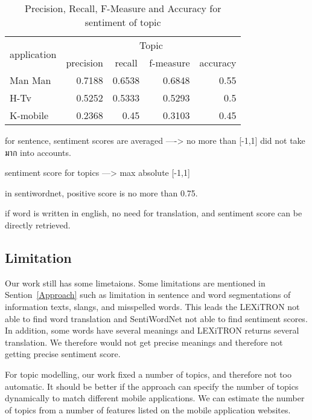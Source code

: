 \begin{table}
	\caption{Precision, Recall, F-Measure and Accuracy for sentiment of topic}
	\label{table:f-measureTopic}
	\centering
	\begin{tabular}{|l|r|r|r|r|}
		\hline
		\multicolumn{1}{|c|}{\multirow{2}{*}{application}} & 
		\multicolumn{4}{|c|}{Topic} \\
		\cline{2-5}
		\multicolumn{1}{|c|}{} &
		\multicolumn{1}{|c|}{precision}&
		\multicolumn{1}{|c|}{recall}&
		\multicolumn{1}{|c|}{f-measure} &
		\multicolumn{1}{|c|}{accuracy} \\
		\hline
		Man Man & 0.7188 & 0.6538 & 0.6848 & 0.55\\
		\hline
		H-Tv & 0.5252 & 0.5333 & 0.5293 & 0.5\\
		\hline
		K-mobile & 0.2368 & 0.45 & 0.3103 & 0.45\\
		\hline
	\end{tabular}
\end{table}


for sentence, sentiment scores are averaged ----> no more than [-1,1]
did not take มาก into accounts.


sentiment score for topics ---> max absolute [-1,1]


in sentiwordnet, positive score is no more than 0.75.


if word is written in english, no need for translation, and sentiment score can be directly retrieved.



\subsection*{Limitation}
Our work still has some limetaions. Some limitations are mentioned in Sention~\ref{Approach} such as limitation in sentence and word segmentations of information texts, slangs, and misspelled words. This leads the LEXiTRON not able to find word translation and SentiWordNet not able to find sentiment scores. In addition, some words have several meanings and LEXiTRON returns several translation. We therefore would not get precise meanings and therefore not getting precise sentiment score.

For topic modelling, our work fixed a number of topics, and therefore not too automatic. It should be better if the approach can specify the number of topics dynamically to match different mobile applications. We can estimate the number of topics from a number of features listed on the mobile application websites.

